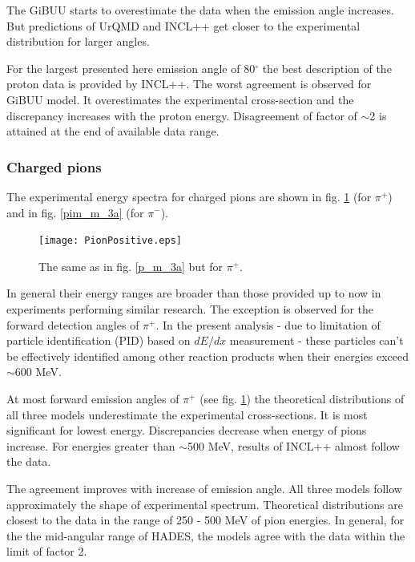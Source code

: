 The GiBUU starts to overestimate the data   
when the emission angle increases.
But predictions of UrQMD and INCL++ get closer 
to the experimental distribution for larger  angles.

For the largest presented here emission angle of 80$^{\circ}$ the best description of the proton data is provided by INCL++. 
The worst agreement is observed for GiBUU model. It overestimates the experimental cross-section and the discrepancy increases with the proton energy. Disagreement of factor of $\sim$2 is attained at the end of available data range.

\subsubsection{\label{charged_pi} Charged pions}

The experimental energy spectra for
charged pions are shown in fig. \ref{pip_m_3a} (for $\pi^{+}$) and in fig. \ref{pim_m_3a} (for $\pi^{-}$). 

\begin{figure}[!hbt]
	\centering
	\texttt{[image: PionPositive.eps]}%
	\caption{\label{pip_m_3a} The same as in fig. \ref{p_m_3a} but for
		$\pi^{+}$.
	}
\end{figure}

In general their energy ranges are broader than those provided up to now in
experiments performing similar research. 
The exception is observed for the forward detection angles of $\pi^{+}$.
In the present analysis - due to limitation of particle identification (PID) based on $dE/dx$ measurement - these particles can't be effectively identified among other reaction products when their energies exceed $\sim$600 MeV.

At most forward emission angles of $\pi^{+}$ (see fig. \ref{pip_m_3a}) the theoretical distributions of all three models underestimate the experimental cross-sections.
It is most significant for lowest energy. Discrepancies decrease when energy of pions increase. For energies greater than $\sim$500 MeV,  results of INCL++ almost follow the data.

The agreement improves with increase of emission angle. All three models follow approximately the shape of experimental spectrum. Theoretical distributions are closest to the data in the range of 250 - 500 MeV of pion energies. 
In general, for the the mid-angular range of HADES, the models agree with the data within the limit of factor 2.

